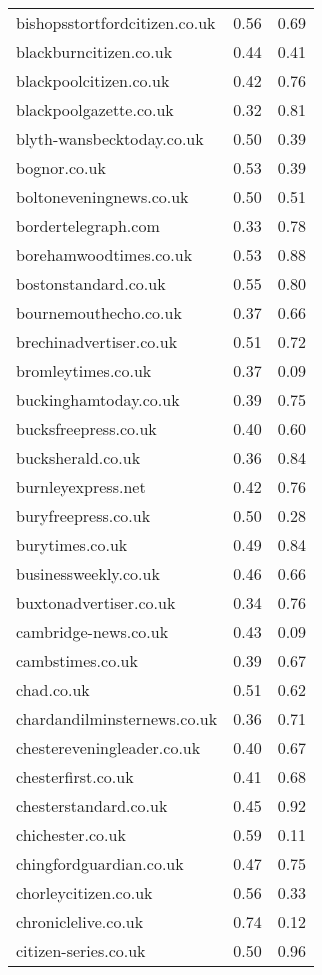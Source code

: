 \begin{longtable}{p{}p{}p{}}
  bishopsstortfordcitizen.co.uk & 0.56 & 0.69 \\ 
  blackburncitizen.co.uk & 0.44 & 0.41 \\ 
  blackpoolcitizen.co.uk & 0.42 & 0.76 \\ 
  blackpoolgazette.co.uk & 0.32 & 0.81 \\ 
  blyth-wansbecktoday.co.uk & 0.50 & 0.39 \\ 
  bognor.co.uk & 0.53 & 0.39 \\ 
  boltoneveningnews.co.uk & 0.50 & 0.51 \\ 
  bordertelegraph.com & 0.33 & 0.78 \\ 
  borehamwoodtimes.co.uk & 0.53 & 0.88 \\ 
  bostonstandard.co.uk & 0.55 & 0.80 \\ 
  bournemouthecho.co.uk & 0.37 & 0.66 \\ 
  brechinadvertiser.co.uk & 0.51 & 0.72 \\ 
  bromleytimes.co.uk & 0.37 & 0.09 \\ 
  buckinghamtoday.co.uk & 0.39 & 0.75 \\ 
  bucksfreepress.co.uk & 0.40 & 0.60 \\ 
  bucksherald.co.uk & 0.36 & 0.84 \\ 
  burnleyexpress.net & 0.42 & 0.76 \\ 
  buryfreepress.co.uk & 0.50 & 0.28 \\ 
  burytimes.co.uk & 0.49 & 0.84 \\ 
  businessweekly.co.uk & 0.46 & 0.66 \\ 
  buxtonadvertiser.co.uk & 0.34 & 0.76 \\ 
  cambridge-news.co.uk & 0.43 & 0.09 \\ 
  cambstimes.co.uk & 0.39 & 0.67 \\ 
  chad.co.uk & 0.51 & 0.62 \\ 
  chardandilminsternews.co.uk & 0.36 & 0.71 \\ 
  chestereveningleader.co.uk & 0.40 & 0.67 \\ 
  chesterfirst.co.uk & 0.41 & 0.68 \\ 
  chesterstandard.co.uk & 0.45 & 0.92 \\ 
  chichester.co.uk & 0.59 & 0.11 \\ 
  chingfordguardian.co.uk & 0.47 & 0.75 \\ 
  chorleycitizen.co.uk & 0.56 & 0.33 \\ 
  chroniclelive.co.uk & 0.74 & 0.12 \\ 
  citizen-series.co.uk & 0.50 & 0.96 \\ 

\end{longtable}
